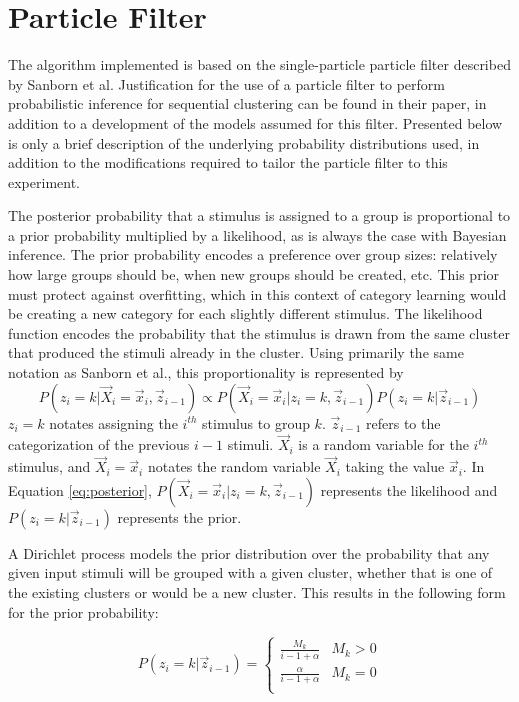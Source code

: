 \section{Particle Filter}
\label{sec:filter}
The algorithm implemented is based on the single-particle particle filter
described by Sanborn et al.\cite{sanborn2010} Justification for the use of a
particle filter to perform probabilistic inference for sequential clustering can
be found in their paper, in addition to a development of the models assumed for
this filter. Presented below is only a brief description of the underlying
probability distributions used, in addition to the modifications required to
tailor the particle filter to this experiment.

The posterior probability that a stimulus is assigned to a group is proportional
to a prior probability multiplied by a likelihood, as is always the case with
Bayesian inference. The prior probability encodes a preference over group sizes:
relatively how large groups should be, when new groups should be created, etc.
This prior must protect against overfitting, which in this context of category
learning would be creating a new category for each slightly different stimulus.
The likelihood function encodes the probability that the stimulus is drawn from
the same cluster that produced the stimuli already in the cluster. Using
primarily the same notation as Sanborn et al., this proportionality is represented by
\begin{equation}
P(z_i = k | \vec{X}_i = \vec{x}_i,  \vec{z}_{i-1}) \propto  P(\vec{X}_i =
\vec{x}_i | z_i = k,  \vec{z}_{i-1}) P(z_i = k | \vec{z}_{i-1})
\label{eq:posterior}
\end{equation}
$z_i = k$ notates assigning the $i^{th}$ stimulus to group $k$. $\vec{z}_{i-1}$ refers to
the categorization of the previous $i - 1$ stimuli. $\vec{X}_i$ is a random
variable for the $i^{th}$ stimulus, and $\vec{X}_i = \vec{x}_i$ notates the
random variable $\vec{X}_i$ taking the value $\vec{x}_i$. 
In Equation \ref{eq:posterior}, $P(\vec{X}_i =
\vec{x}_i | z_i = k,  \vec{z}_{i-1})$ represents the likelihood and $P(z_i = k |
\vec{z}_{i-1})$ represents the prior.

A Dirichlet process models the prior distribution over the probability that
any given input stimuli will be grouped with a given cluster, whether that is one
of the existing clusters or would be a new cluster. This results in the
following form for the prior probability:

\begin{equation}
P(z_i = k | \vec{z}_{i-1}) = 
\begin{cases}
  \frac{M_k}{i - 1 + \alpha} & M_k > 0 \\
  \frac{\alpha}{i - 1 + \alpha} & M_k = 0 \\
\end{cases}
\end{equation}

